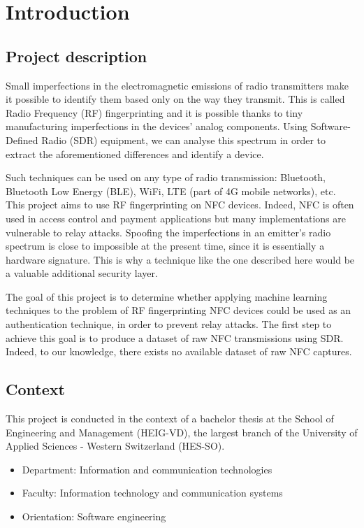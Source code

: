 \section{Introduction}

\subsection{Project description}

Small imperfections in the electromagnetic emissions of radio transmitters make it possible to identify them based only on the way they transmit. This is called Radio Frequency (RF) fingerprinting and it is possible thanks to tiny manufacturing imperfections in the devices' analog components. Using Software-Defined Radio (SDR) equipment, we can analyse this spectrum in order to extract the aforementioned differences and identify a device.

Such techniques can be used on any type of radio transmission: Bluetooth, Bluetooth Low Energy (BLE), WiFi, LTE (part of 4G mobile networks), etc. This project aims to use RF fingerprinting on NFC devices. Indeed, NFC is often used in access control and payment applications but many implementations are vulnerable to relay attacks. Spoofing the imperfections in an emitter's radio spectrum is close to impossible at the present time, since it is essentially a hardware signature. This is why a technique like the one described here would be a valuable additional security layer.

The goal of this project is to determine whether applying machine learning techniques to the problem of RF fingerprinting NFC devices could be used as an authentication technique, in order to prevent relay attacks. The first step to achieve this goal is to produce a dataset of raw NFC transmissions using SDR. Indeed, to our knowledge, there exists no available dataset of raw NFC captures.

\subsection{Context}

This project is conducted in the context of a bachelor thesis at the School of Engineering and Management (HEIG-VD), the largest branch of the University of Applied Sciences - Western Switzerland (HES-SO).

\begin{itemize}
  \item Department: Information and communication technologies
  \item Faculty: Information technology and communication systems
  \item Orientation: Software engineering
\end{itemize}

